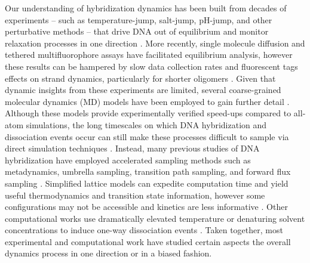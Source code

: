 \documentclass[journal=jpcbfk,manuscript=article]{achemso}
\begin{document}
Our understanding of hybridization dynamics has been built from decades of experiments -- such as temperature-jump, salt-jump, pH-jump, and other perturbative methods -- that drive DNA out of equilibrium and monitor relaxation processes in one direction \citep{Morrison1993SensitiveSolution, Wetmur1968KineticsDNA, Craig1971ElaxationOligon, Porschke1973ThermodynamicsPairs, Williams1989LaserDGCATGC, Narayanan2012ExploringMixing, Chen2007InfluenceHybridization, Sanstead2018DirectDehybridization}. More recently, single molecule diffusion and tethered multifluorophore assays have facilitated equilibrium analysis, however these results can be hampered by slow data collection rates and fluorescent tags effects on strand dynamics, particularly for shorter oligomers \citep{Liu20173DSolution,  Schickinger2018TetheredHelices, Chen2008Base-by-baseSpectroscopy, Dupuis2013Single-moleculeHelices, Morrison1993SensitiveSolution}. Given that dynamic insights from these experiments are limited, several coarse-grained molecular dynamics (MD) models have been employed to gain further detail \citep{Romano2013DNADependence, Hinckley2013AnHybridization, Maciejczyk2014DNAModel, Markegard2015}. Although these models provide experimentally verified speed-ups compared to all-atom simulations, the long timescales on which DNA hybridization and dissociation events occur can still make these processes difficult to sample via direct simulation techniques \citep{Phys2014}. Instead, many previous studies of DNA hybridization have employed accelerated sampling methods such as metadynamics, umbrella sampling,  transition path sampling, and forward flux sampling \citep{Schmitt2013ExploringSurface, Sambriski2009,  Hoefert2011MolecularOligonucleotides, Romano2013DNADependence}. Simplified lattice models can expedite computation time and yield useful thermodynamics and transition state information, however some configurations may not be accessible and kinetics are less informative \citep{Araque2016LatticeCooperativity, Phys2019}. Other computational works use dramatically elevated temperature or denaturing solvent concentrations to induce one-way dissociation events \citep{Wong2008TheSimulations, Perez2010Real-timeUnfolding}. Taken together, most experimental and computational work have studied certain aspects the overall dynamics process in one direction or in a biased fashion.
\end{document}

